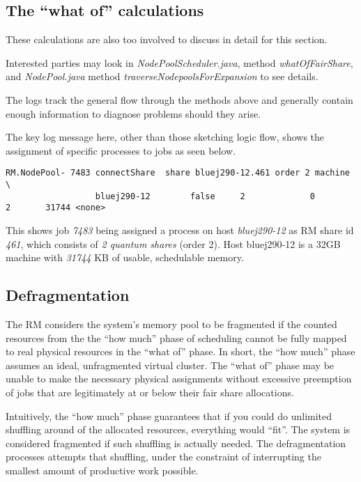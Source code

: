 \subsection{The ``what of'' calculations}
    These calculations are also too involved to discuss in detail for this section.

    Interested parties may look in {\em NodePoolScheduler.java}, method
    {\em whatOfFairShare}, and {\em NodePool.java} method {\em traverseNodepoolsForExpansion}
    to see details.

    The logs track the general flow through the methods above and generally contain
    enough information to diagnose problems should they arise.  

    The key log message here, other than those sketching logic flow, shows the
    assignment of specific processes to jobs as seen below.

\begin{verbatim}
RM.NodePool- 7483 connectShare  share bluej290-12.461 order 2 machine \
                  bluej290-12        false     2             0             2       31744 <none>
\end{verbatim}
    This shows job {\em 7483} being assigned a process on host {\em bluej290-12} as
    RM share id {\em 461}, which consists of {\em 2 quantum shares} (order 2).  Host
    bluej290-12 is a 32GB machine with {\em 31744} KB of usable, schedulable memory.

\subsection{Defragmentation}
    The RM considers the system's memory pool to be fragmented if the counted
    resources from the the ``how much'' phase of scheduling cannot be fully
    mapped to real physical resources in the ``what of'' phase.  In short, the
    ``how much'' phase assumes an ideal, unfragmented virtual cluster.  The ``what of''
    phase may be unable to make the necessary physical assignments without excessive
    preemption of jobs that are legitimately at or below their fair share allocations.

    Intuitively, the ``how much'' phase guarantees that if you could do unlimited
    shuffling around of the allocated resources, everything would ``fit''.  The
    system is considered fragmented if such shuffling is actually needed.  The
    defragmentation processes attempts that shuffling, under the constraint of
    interrupting the smallest amount of productive work possible.


